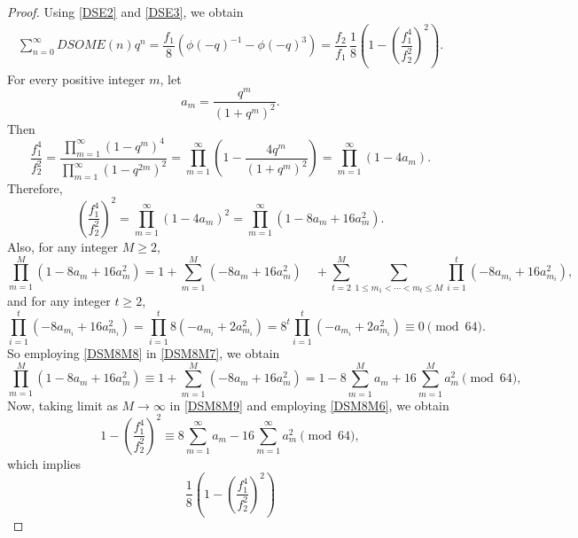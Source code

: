\documentclass[12pt]{article}
\numberwithin{equation}{section}
\theoremstyle{definition}
\theoremstyle{remark}
\numberwithin{equation}{section}
\begin{document}
\begin{proof}
Using \eqref{DSE2} and \eqref{DSE3}, we obtain
\begin{align}
\sum_{n=0}^{\infty}DSOME(n)q^n
=
\dfrac{f_1}{8}
\left(
\phi(-q)^{-1}-\phi(-q)^3
\right)
=
\dfrac{f_2}{f_1}\,
\dfrac{1}{8}
\left(
1-
\left(
\dfrac{f_1^4}{f_2^2}
\right)^2
\right).
\label{DSM8M3}
\end{align}
For every positive integer $m$, let
\begin{equation}\label{DSM8M4}
a_m=\dfrac{q^m}{(1+q^m)^2}.
\end{equation}
Then
$$\dfrac{f_1^4}{f_2^2}=
\dfrac{\displaystyle\prod_{m=1}^{\infty}(1-q^m)^4}
     {\displaystyle\prod_{m=1}^{\infty}(1-q^{2m})^2}=
\prod_{m=1}^{\infty}
\left(
1-\dfrac{4q^m}{(1+q^m)^2}
\right)=
\prod_{m=1}^{\infty}(1-4a_m).$$
Therefore,
\begin{equation}\label{DSM8M6}
\left(
\dfrac{f_1^4}{f_2^2}
\right)^2=
\prod_{m=1}^{\infty}(1-4a_m)^2=
\prod_{m=1}^{\infty}
\left(
1-8a_m+16a_m^2
\right).
\end{equation}
Also, for any  integer $M\geq2$, 
\begin{equation}\label{DSM8M7}
\prod_{m=1}^{M}
\left(
1-8a_m+16a_m^2
\right)
=
1+
\sum_{m=1}^{M}
\left(
-8a_m+16a_m^2
\right)\quad+
\sum_{t=2}^{M}
\sum_{1\leq m_1<\cdots<m_t\leq M}
\prod_{i=1}^{t}
\left(
-8a_{m_i}+16a_{m_i}^2
\right),
\end{equation} and for any integer 
 $t\geq2$, 
\begin{equation}\label{DSM8M8}
\prod_{i=1}^{t}
\left(
-8a_{m_i}+16a_{m_i}^2
\right)=
\prod_{i=1}^{t}
8\left(
-a_{m_i}+2a_{m_i}^2
\right)
=
8^t
\prod_{i=1}^{t}
\left(
-a_{m_i}+2a_{m_i}^2
\right)
\equiv0\pmod{64}.
\end{equation}
So employing \eqref{DSM8M8} in \eqref{DSM8M7}, we obtain
\begin{equation}\label{DSM8M9}
\prod_{m=1}^{M}
\left(
1-8a_m+16a_m^2
\right)
\equiv
1+
\sum_{m=1}^{M}
\left(
-8a_m+16a_m^2
\right)
=
1-8\sum_{m=1}^{M}a_m
+16\sum_{m=1}^{M}a_m^2
\pmod{64},
\end{equation}
Now, taking limit as
$M\rightarrow\infty$ in \eqref{DSM8M9} and employing
\eqref{DSM8M6}, we obtain
\begin{equation*}
1-
\left(
\dfrac{f_1^4}{f_2^2}
\right)^2
\equiv
8\sum_{m=1}^{\infty}a_m
-16\sum_{m=1}^{\infty}a_m^2
\pmod{64},
\end{equation*}
which implies
\begin{equation}\label{DSM8M11}
\dfrac{1}{8}
\left(
1-
\left(
\dfrac{f_1^4}{f_2^2}
\right)^2
\right)

\end{equation}
\end{proof}
\end{document}
